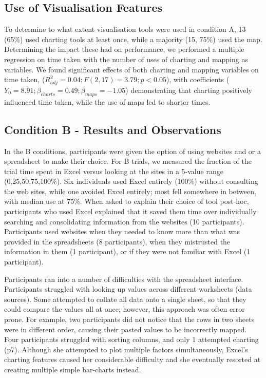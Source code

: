 \documentclass{sigchi}
\begin{document}
\subsection{Use of Visualisation Features}
To determine to what extent visualisation tools were used in condition A, 13 (65\%) used charting tools at least once, while a majority (15, 75\%) used the map.  Determining the impact these had on performance, we performed a multiple regression on time taken with the number of uses of charting and mapping as variables.   We found significant effects of both charting and mapping variables on time taken, ($R^2_{adj} = 0.04; F(2,17)=3.79; p<0.05$), with coefficients ($Y_0=8.91;\beta_{charts}=0.49;\beta_{maps}=-1.05$) demonstrating that charting positively influenced time taken, while the use of maps led to shorter times.

\subsection{Condition B - Results and Observations}
In the B conditions, participants were given the option of using websites and or a spreadsheet to make their choice.  For B trials, we measured the fraction of the trial time spent in Excel versus looking at the sites in a 5-value range (0,25,50,75,100\%).  Six individuals used Excel entirely (100\%) without consulting the web sites, while one avoided Excel entirely; most fell somewhere in between, with median use at 75\%.   When asked to explain their choice of tool post-hoc, participants who used Excel explained that it saved them time over individually searching and consolidating information from the websites (10 participants).  Participants used websites when they needed to know more than what was provided in the spreadsheets (8 participants), when they mistrusted the information in them (1 participant), or if they were not familiar with Excel (1 participant).

Participants ran into a number of difficulties with the spreadsheet interface. Participants struggled with looking up values across different worksheets (data sources).  Some attempted to collate all data onto a single sheet, so that they could compare the values all at once; however, this approach was often error prone.  For example, two participants did not notice that the rows in two sheets were in different order, causing their pasted values to be incorrectly mapped.  Four participants struggled with sorting columns, and only 1 attempted charting (p7).  Although she attempted to plot multiple factors simultaneously, Excel's charting features caused her considerable difficulty and she eventually resorted at creating multiple simple bar-charts instead.
\end{document}

